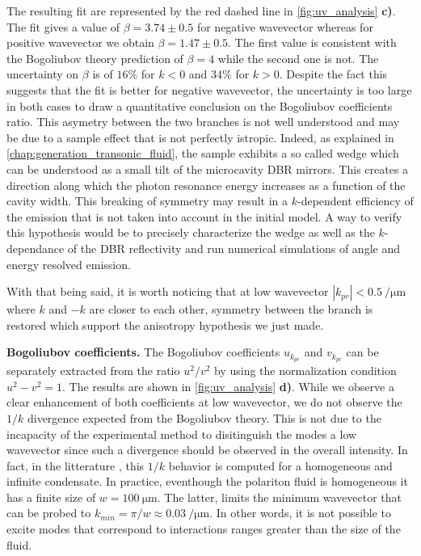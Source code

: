 \bigskip

The resulting fit are represented by the red dashed line in \autoref{fig:uv_analysis} \textbf{c)}. The fit gives a value of $\beta=3.74\pm0.5$ for negative wavevector whereas for positive wavevector we obtain $\beta=1.47\pm{0.5}$. The first value is consistent with the Bogoliubov theory prediction of $\beta=4$ while the second one is not. The uncertainty on $\beta$ is of $16\%$ for $k<0$ and $34\%$ for $k>0$. Despite the fact this suggests that 
the fit is better for negative wavevector, the uncertainty is too large in both cases to draw a quantitative conclusion on the Bogoliubov coefficients ratio. This asymetry between the two branches is not well understood and may be due to a sample effect that is not perfectly istropic. Indeed, 
as explained in \autoref{chap:generation_transonic_fluid}, the sample exhibits a so called wedge which can be understood as a small tilt of the microcavity DBR mirrors. This creates a direction along which the photon resonance energy increases as a function of the cavity width.
This breaking of symmetry may result in a $k$-dependent efficiency of the emission that is not taken into account in the initial model. A way to verify this hypothesis would be to precisely characterize the wedge as well as the $k$-dependance of the DBR reflectivity and run numerical simulations of angle and energy resolved emission. 

With that being said, it is worth noticing that at low wavevector $|k_{pr}|<\SI{0.5}{\per\micro\meter}$ where $k$ and $-k$ are closer to each other, symmetry between the branch is restored which support the anisotropy hypothesis 
we just made.

\bigskip

\textbf{Bogoliubov coefficients.} The Bogoliubov coefficients $u_{k_{pr}}$ and $v_{k_{pr}}$ can be separately extracted from the ratio $u^2/v^2$ by using the normalization condition $u^2-v^2=1$. The 
results are shown in \autoref{fig:uv_analysis} \textbf{d)}. While we observe a clear enhancement of both coefficients at low wavevector, we do not observe the $1/k$ divergence expected from the Bogoliubov theory. This is not due to the incapacity of the experimental method to disitinguish the modes a low wavevector since 
such a divergence should be observed in the overall intensity.
In fact, in the litterature \cite{pitaevskij_bose-einstein_2016,castin_bose-einstein_2001,pethick_bose-einstein_2008}, this $1/k$ behavior is computed for a homogeneous and infinite condensate. In practice, eventhough the polariton fluid is homogeneous it has a finite size of $w=\SI{100}{\micro\meter}$. The latter,
limits the minimum wavevector that can be probed to $k_{min}=\pi/w\approx\SI{0.03}{\per\micro\meter}$. In other words, it is not possible to excite modes that correspond to interactions ranges greater than the size of the fluid.

